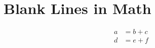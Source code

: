 \documentclass{article}
\begin{document}
\section{Blank Lines in Math}
\begin{align}
  a &= b + c \\

  d &= e + f
\end{align}
\end{document}
